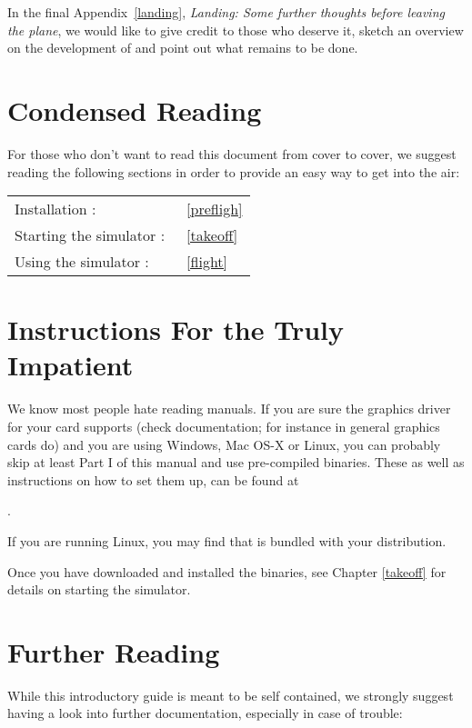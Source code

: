  \noindent
  In the final Appendix~\ref{landing}, \textit{Landing: Some further thoughts before leaving the plane}, we would like to give credit to those who deserve it, sketch an overview
on the development of \FlightGear and point out what remains to be done.
 \medskip

\section{Condensed Reading}

For those who don't want to read this document from cover to cover, we suggest reading the following
sections in order to provide an easy way to get into the air:

\begin{tabular}{ll}
 Installation :             &~\ref{prefligh}\\
 Starting the simulator :   &~\ref{takeoff}\\
 Using the simulator :      &~\ref{flight}\\
\end{tabular}
\bigskip

\section{Instructions For the Truly Impatient}

We know most people hate reading manuals. If you are sure the graphics driver for your card supports  (check documentation; for instance in general  graphics cards do) and you are using Windows, Mac OS-X or Linux, you can probably skip at least Part I of this manual and use pre-compiled binaries. These as well as instructions on how to set them up, can be found at
 \medskip

.
 \medskip

 \noindent
If you are running Linux, you may find that \FlightGear{} is bundled with your distribution.

Once you have downloaded and installed the binaries, see Chapter \ref{takeoff} for details on starting the simulator.

\section{Further Reading}

\noindent
 While this introductory guide is meant to be self contained, we strongly suggest having a look into further documentation, especially in case of trouble:

